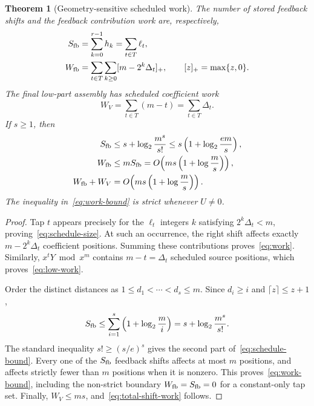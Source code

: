 \documentclass{mcom-l}
\numberwithin{equation}{section}
\newtheorem{theorem}{Theorem}[section]
\theoremstyle{definition}
\theoremstyle{remark}
\newcommand{\Wfb}{W_{\mathrm{fb}}}
\begin{document}
\begin{theorem}[Geometry-sensitive scheduled work]
\label{thm:work}
The number of stored feedback shifts and the feedback contribution work are,
respectively,
\begin{align}
  S_{\rm fb}
    &=\sum_{k=0}^{r-1}h_k
      =\sum_{t\in T}\ell_t,
      \label{eq:schedule-size}\\
  \Wfb
    &=\sum_{t\in T}\sum_{k\ge0}[m-2^k\Delta_t]_+,
      \qquad [z]_+=\max\{z,0\}.
  \label{eq:work}
\end{align}
The final low-part assembly has scheduled coefficient work
\begin{equation}
  W_V=\sum_{t\in T}(m-t)=\sum_{t\in T}\Delta_t.
  \label{eq:low-work}
\end{equation}
If $s\ge1$, then
\begin{align}
  S_{\rm fb}
  &\le s+\log_2\frac{m^s}{s!}
   \le s\left(1+\log_2\frac{em}{s}\right),                 \label{eq:schedule-bound}\\
  \Wfb
  &\le mS_{\rm fb}
   =O\!\left(ms\left(1+\log\frac{m}{s}\right)\right),      \label{eq:work-bound}\\
  \Wfb+W_V
  &=O\!\left(ms\left(1+\log\frac{m}{s}\right)\right).
  \label{eq:total-shift-work}
\end{align}
The inequality in~\eqref{eq:work-bound} is strict whenever $U\ne0$.
\end{theorem}
\begin{proof}
Tap $t$ appears precisely for the $\ell_t$ integers $k$ satisfying
$2^k\Delta_t<m$, proving~\eqref{eq:schedule-size}.  At such an occurrence,
the right shift affects exactly $m-2^k\Delta_t$ coefficient positions.
Summing these contributions proves~\eqref{eq:work}.  Similarly,
$x^tY\bmod x^m$ contains $m-t=\Delta_t$ scheduled source positions, which
proves~\eqref{eq:low-work}.

Order the distinct distances as
$1\le d_1<\cdots<d_s\le m$.  Since $d_i\ge i$ and
$\lceil z\rceil\le z+1$,
\[
  S_{\rm fb}
  \le\sum_{i=1}^s\left(1+\log_2\frac{m}{i}\right)
  =s+\log_2\frac{m^s}{s!}.
\]
The standard inequality $s!\ge(s/e)^s$ gives the second part
of~\eqref{eq:schedule-bound}.  Every one of the $S_{\rm fb}$ feedback shifts
affects at most $m$ positions, and affects strictly fewer than $m$ positions
when it is nonzero.  This proves~\eqref{eq:work-bound}, including the
non-strict boundary $\Wfb=S_{\rm fb}=0$ for a constant-only tap set.  Finally,
$W_V\le ms$, and~\eqref{eq:total-shift-work} follows.
\end{proof}
\end{document}
